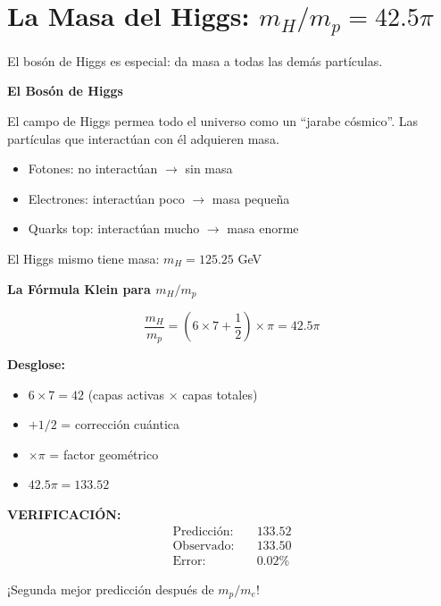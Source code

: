 \section{La Masa del Higgs: $m_H/m_p = 42.5\pi$}

El bosón de Higgs es especial: da masa a todas las demás partículas.

\begin{nivelconceptual}
\textbf{El Bosón de Higgs}

El campo de Higgs permea todo el universo como un ``jarabe cósmico''.
Las partículas que interactúan con él adquieren masa.

\begin{itemize}
    \item Fotones: no interactúan $\to$ sin masa
    \item Electrones: interactúan poco $\to$ masa pequeña
    \item Quarks top: interactúan mucho $\to$ masa enorme
\end{itemize}

El Higgs mismo tiene masa: $m_H = 125.25$ GeV
\end{nivelconceptual}

\begin{nivelmatematico}
\textbf{La Fórmula Klein para $m_H/m_p$}

\begin{equation}
\boxed{\frac{m_H}{m_p} = \left(6 \times 7 + \frac{1}{2}\right) \times \pi = 42.5\pi}
\end{equation}

\textbf{Desglose:}
\begin{itemize}
    \item $6 \times 7 = 42$ (capas activas $\times$ capas totales)
    \item $+ 1/2$ = corrección cuántica
    \item $\times \pi$ = factor geométrico
    \item $42.5\pi = 133.52$
\end{itemize}

\textbf{VERIFICACIÓN:}
\begin{align}
\text{Predicción:} & \quad 133.52\\
\text{Observado:} & \quad 133.50\\
\text{Error:} & \quad 0.02\%
\end{align}

¡Segunda mejor predicción después de $m_p/m_e$!
\end{nivelmatematico}


